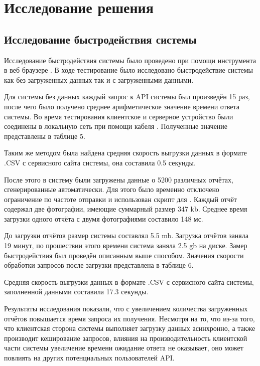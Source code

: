 
\section{Исследование решения}

\subsection{Исследование быстродействия системы}

\tab
Исследование быстродействия системы было проведено при помощи инструмента  в веб браузере . В ходе тестирование было исследовано быстродействие системы как без загруженных данных так и с загруженными данными.

\tab
Для системы без данных каждый запрос к API системы был произведён 15 раз, после чего было получено среднее арифметическое значение времени ответа системы.
Во время тестирования клиентское и серверное устройство были соединены в локальную сеть при помощи кабеля .
Полученные значение представлены в таблице 5.
\tablefive

\tab
Таким же методом была найдена средняя скорость выгрузки данных в формате .CSV с сервисного сайта системы, она составила 0.5 секунды.

\tab
После этого в систему были загружены данные о 5200 различных отчётах, сгенерированные автоматически.
Для этого было временно отключено ограничение по частоте отправки и использован скрипт для .
Каждый отчёт содержал две фотографии, имеющие суммарный размер 347 kb. Среднее время загрузки одного отчёта с двумя фотографиями составило 148 мс.

\tab
До загрузки отчётов размер системы составлял 5.5 mb.
Загрузка отчётов заняла 19 минут, по прошествии этого времени система заняла 2.5 gb на диске.
Замер быстродействия был проведён описанным выше способом.
Значения скорости обработки запросов после загрузки представлена в таблице 6.
\tablesix

\tab
Средняя скорость выгрузки данных в формате .CSV с сервисного сайта системы, заполненной данными составила 17.3 секунды.

\tab
Результаты исследования показали, что с увеличением количества загруженных отчётов повышается время запроса их получения.
Несмотря на то, что из-за того, что клиентская сторона системы выполняет загрузку данных асинхронно, а также производит кеширование запросов, влияния на производительность клиентской части системы увеличение времени ожидание ответа не оказывает, оно может повлиять на других потенциальных пользователей API.

